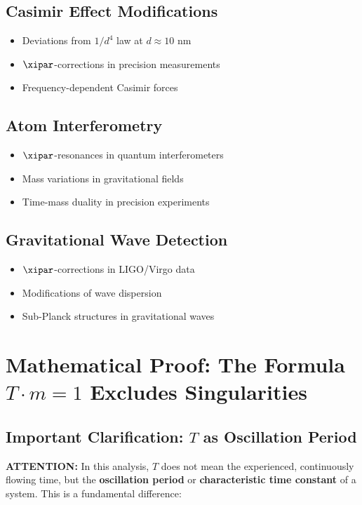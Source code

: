	\subsection{Casimir Effect Modifications}
	
	\begin{itemize}
		\item Deviations from $1/d^4$ law at $d \approx 10$ nm
		\item $\xipar$-corrections in precision measurements
		\item Frequency-dependent Casimir forces
	\end{itemize}
	
	\subsection{Atom Interferometry}
	
	\begin{itemize}
		\item $\xipar$-resonances in quantum interferometers
		\item Mass variations in gravitational fields
		\item Time-mass duality in precision experiments
	\end{itemize}
	
	\subsection{Gravitational Wave Detection}
	
	\begin{itemize}
		\item $\xipar$-corrections in LIGO/Virgo data
		\item Modifications of wave dispersion
		\item Sub-Planck structures in gravitational waves
	\end{itemize}
	
	\section{Mathematical Proof: The Formula $T \cdot m = 1$ Excludes Singularities}
	
	\subsection{Important Clarification: $T$ as Oscillation Period}
	
	\textbf{ATTENTION:} In this analysis, $T$ does not mean the experienced, continuously flowing time, but the \textbf{oscillation period} or \textbf{characteristic time constant} of a system. This is a fundamental difference:
	
